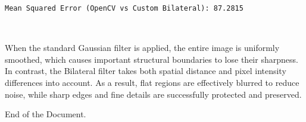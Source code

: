 \documentclass[11pt]{article}
\begin{document}
    \begin{Verbatim}[commandchars=\\\{\}]
Mean Squared Error (OpenCV vs Custom Bilateral): 87.2815
    \end{Verbatim}

    \begin{center}
    \end{center}
    { \hspace*{\fill} \\}
    
    When the standard Gaussian filter is applied, the entire image is
uniformly smoothed, which causes important structural boundaries to lose
their sharpness. In contrast, the Bilateral filter takes both spatial
distance and pixel intensity differences into account. As a result, flat
regions are effectively blurred to reduce noise, while sharp edges and
fine details are successfully protected and preserved.


\vfill
\hfill End of the Document.\hfill \ 
    
    
    
\end{document}
